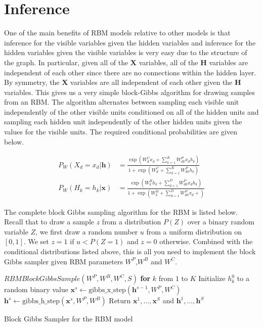 \documentclass[11pt]{article}
\newcommand{\mbf}[1]{{\mathbf{#1}}}
\begin{document}
\section{Inference} One of the main benefits of RBM models relative to other models is that inference for the visible variables given the hidden variables and inference for the hidden variables given the visible variables is very easy due to the structure of the graph. In particular, given all of the $\mbf{X}$ variables, all of the $\mbf{H}$ variables are independent of each other since there are no connections within the hidden layer. By symmetry, the $\mbf{X}$ variables are all independent of each other given the $\mbf{H}$ variables. This gives us a very simple block-Gibbs algorithm for drawing samples from an RBM. The algorithm alternates between sampling each visible unit independently of the other visible units conditioned on all of the hidden units and sampling each hidden unit independently of the other hidden units given the values for the visible units. The required conditional probabilities are given below.

\begin{align}
\label{pxgh}
P_W(X_d=x_d|\mbf{h})&= \frac{\exp(W^C_dx_d + \sum_{k=1}^K W^P_{dk}x_dh_k)}
{1+ \exp(W^C_d + \sum_{k=1}^K W^P_{dk}h_k) }\\
\label{phgx}
P_W(H_k=h_k|\mbf{x})&= \frac{\exp(W^B_kh_k + \sum_{d=1}^D W^P_{dk}x_dh_k )}
{1+ \exp(W^B_k + \sum_{d=1}^D W^P_{dk}x_d + ) }
\end{align}

The complete block Gibbs sampling algorithm for the RBM is listed below. Recall that to draw a sample $z$ from a distribution $P(Z)$ over a binary random variable $Z$, we first draw a random number $u$ from a uniform distribution on $[0,1]$. We set $z=1$ if $u<P(Z=1)$ and $z=0$ otherwise. Combined with the conditional distributions listed above, this is all you need to implement the block Gibbs sampler given RBM parameters $W^P$,$W^B$ and $W^C$.\\

\begin{algorithm}[h!]
\begin{algorithmic}
\STATE $RBMBlockGibbsSample(W^P,W^B,W^C,S)$
\STATE \textbf{for} $k$ from $1$ to $K$ Initialize $h_k^0$ to a random binary value
\STATE $\mbf{x}^s \leftarrow \mbox{gibbs\_x\_step}(\mbf{h}^{s-1},W^P,W^C)$
\STATE $\mbf{h}^s \leftarrow \mbox{gibbs\_h\_step}(\mbf{x}^{s},W^P,W^B)$
\ENDFOR
\STATE Return $\mbf{x}^1,...,\mbf{x}^S$ and $\mbf{h}^1,...,\mbf{h}^S$
\end{algorithmic}
\caption{Block Gibbs Sampler for the RBM model}
\label{inference}
\end{algorithm}
\end{document}
